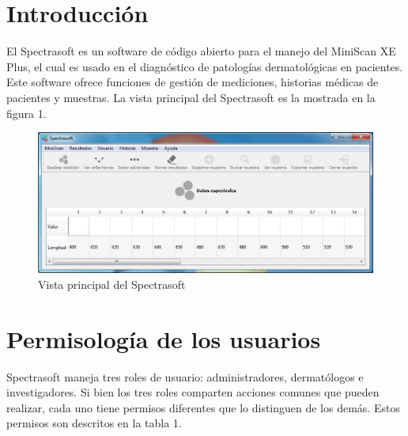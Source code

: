 \null
\vfill

\section{Introducci\'{o}n}
	El Spectrasoft es un software de c\'{o}digo abierto para el manejo del MiniScan XE Plus, el cual es usado en el diagn\'{o}stico de patolog\'{i}as dermatol\'{o}gicas en pacientes. Este software ofrece funciones de gesti\'{o}n de mediciones, historias m\'{e}dicas de pacientes y muestras. La vista principal del Spectrasoft es la mostrada en la figura 1.

\begin{figure}[H]
  \centering
  \includegraphics[width=1\linewidth]{./img/vista-principal.jpg}
\caption{Vista principal del Spectrasoft}
\end{figure}

\newpage

\section{Permisolog\'{i}a de los usuarios}

	Spectrasoft maneja tres roles de usuario: administradores, dermat\'{o}logos e investigadores. Si bien los tres roles comparten acciones comunes que pueden realizar, cada uno tiene permisos diferentes que lo distinguen de los dem\'{a}s. Estos permisos son descritos en la tabla 1.

